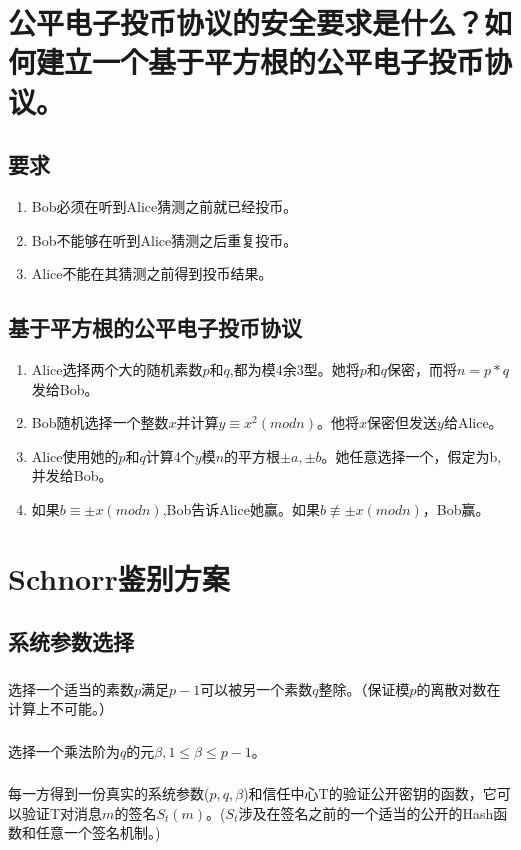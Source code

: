 \documentclass[11pt,a4paper]{article}
\begin{document}
\section{公平电子投币协议的安全要求是什么？如何建立一个基于平方根的公平电子投币协议。}

\subsection{要求}
\begin{enumerate}[(1)]
\item Bob必须在听到Alice猜测之前就已经投币。
\item Bob不能够在听到Alice猜测之后重复投币。
\item Alice不能在其猜测之前得到投币结果。
\end{enumerate}
\subsection{基于平方根的公平电子投币协议}
\begin{enumerate}
\item Alice选择两个大的随机素数$p$和$q$,都为模4余3型。她将$p$和$q$保密，而将$n=p*q$发给Bob。
\item Bob随机选择一个整数$x$并计算$y \equiv x^2(mod n)$。他将$x$保密但发送$y$给Alice。
\item Alice使用她的$p$和$q$计算4个$y$模$n$的平方根$\pm a,\pm b$。她任意选择一个，假定为b,并发给Bob。
\item 如果$b\equiv \pm x(mod n)$,Bob告诉Alice她赢。如果$b \not\equiv\pm x(mod n)$，Bob赢。
\end{enumerate}
\section{Schnorr鉴别方案}

\subsection{系统参数选择}
\subsubsection{}选择一个适当的素数$p$满足$p-1$可以被另一个素数$q$整除。（保证模$p$的离散对数在计算上不可能。）
\subsubsection{}选择一个乘法阶为$q$的元$\beta, 1\le \beta \le p-1$。
\subsubsection{}每一方得到一份真实的系统参数($p,q,\beta$)和信任中心T的验证公开密钥的函数，它可以验证T对消息$m$的签名$S_t(m)$。($S_t$涉及在签名之前的一个适当的公开的Hash函数和任意一个签名机制。)
\end{document}
